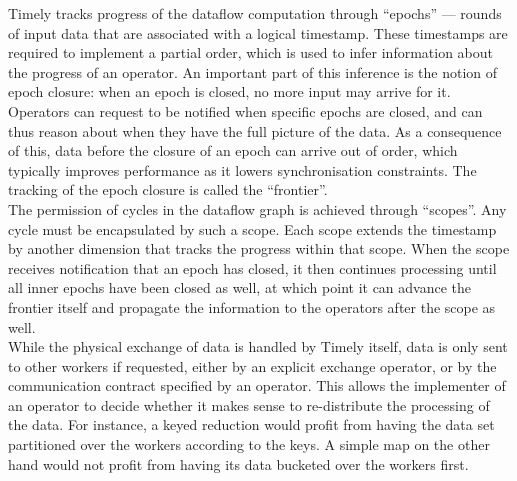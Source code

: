 Timely tracks progress of the dataflow computation through ``epochs'' --- rounds of input data that are associated with a logical timestamp. These timestamps are required to implement a partial order, which is used to infer information about the progress of an operator. An important part of this inference is the notion of epoch closure: when an epoch is closed, no more input may arrive for it. Operators can request to be notified when specific epochs are closed, and can thus reason about when they have the full picture of the data. As a consequence of this, data before the closure of an epoch can arrive out of order, which typically improves performance as it lowers synchronisation constraints. The tracking of the epoch closure is called the ``frontier''. \\

The permission of cycles in the dataflow graph is achieved through ``scopes''. Any cycle must be encapsulated by such a scope. Each scope extends the timestamp by another dimension that tracks the progress within that scope. When the scope receives notification that an epoch has closed, it then continues processing until all inner epochs have been closed as well, at which point it can advance the frontier itself and propagate the information to the operators after the scope as well. \\

While the physical exchange of data is handled by Timely itself, data is only sent to other workers if requested, either by an explicit exchange operator, or by the communication contract specified by an operator. This allows the implementer of an operator to decide whether it makes sense to re-distribute the processing of the data. For instance, a keyed reduction would profit from having the data set partitioned over the workers according to the keys. A simple map on the other hand would not profit from having its data bucketed over the workers first.

